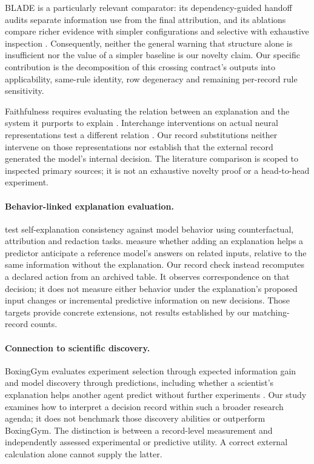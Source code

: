 BLADE is a particularly relevant comparator: its dependency-guided handoff
audits separate information use from the final attribution, and its ablations
compare richer evidence with simpler configurations and selective with
exhaustive inspection \citep{guo2026blade}. Consequently, neither the general
warning that structure alone is insufficient nor the value of a simpler
baseline is our novelty claim. Our specific contribution is the decomposition
of this crossing contract's outputs into applicability, same-rule identity,
row degeneracy and remaining per-record rule sensitivity.

Faithfulness requires evaluating the relation between an explanation and the
system it purports to explain \citep{jacovi2020faithful}. Interchange
interventions on actual neural representations test a different relation
\citep{geiger2021causal}. Our record substitutions neither intervene on those
representations nor establish that the external record generated the model's
internal decision. The literature comparison is scoped to inspected primary
sources; it is not an exhaustive novelty proof or a head-to-head experiment.

\paragraph{Behavior-linked explanation evaluation.}
\citet{madsen2024self} test self-explanation consistency against model behavior
using counterfactual, attribution and redaction tasks. \citet{mayne2026positive}
measure whether adding an explanation helps a predictor anticipate a reference
model's answers on related inputs, relative to the same information without
the explanation. Our record check instead recomputes a declared action from
an archived table. It observes correspondence on that decision; it does not
measure either behavior under the explanation's proposed input changes or
incremental predictive information on new decisions. Those targets provide
concrete extensions, not results established by our matching-record counts.

\paragraph{Connection to scientific discovery.}
BoxingGym evaluates experiment selection through expected information gain
and model discovery through predictions, including whether a scientist's
explanation helps another agent predict without further experiments
\citep{gandhi2025boxinggym}. Our study examines how to interpret a decision
record within such a broader research agenda; it does not benchmark those
discovery abilities or outperform BoxingGym. The distinction is between a
record-level measurement and independently assessed experimental or predictive
utility. A correct external calculation alone cannot supply the latter.

